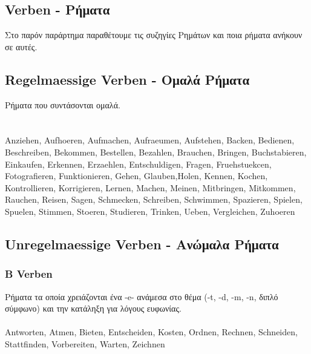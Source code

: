 
\begin{appendix}
 
 \section{Verben - Ρήματα}
 
 Στο παρόν παράρτημα παραθέτουμε τις συζηγίες Ρημάτων και ποια ρήματα ανήκουν σε αυτές.
 
 \subsection{Regelmaessige Verben - Ομαλά Ρήματα}
 Ρήματα που συντάσονται ομαλά. \\ 
  \\ 
  \\
 
 \gls{Anziehen}, \gls{Aufhoeren}, \gls{Aufmachen}, \gls{Aufraeumen}, \gls{Aufstehen}, \gls{Backen}, \gls{Bedienen}, \gls{Beschreiben}, \gls{Bekommen}, \gls{Bestellen}, \gls{Bezahlen}, \gls{Brauchen}, \gls{Bringen}, \gls{Buchstabieren}, \gls{Einkaufen}, \gls{Erkennen}, \gls{Erzaehlen}, \gls{Entschuldigen}, \gls{Fragen}, \gls{Fruehstuekcen}, \gls{Fotografieren}, \gls{Funktionieren}, \gls{Gehen}, \gls{Glauben},\gls{Holen}, \gls{Kennen}, \gls{Kochen}, \gls{Kontrollieren}, \gls{Korrigieren}, \gls{Lernen}, \gls{Machen}, \gls{Meinen}, \gls{Mitbringen}, \gls{Mitkommen}, \gls{Rauchen}, \gls{Reisen}, \gls{Sagen}, \gls{Schmecken}, \gls{Schreiben}, \gls{Schwimmen}, \gls{Spazieren}, \gls{Spielen}, \gls{Spuelen}, \gls{Stimmen}, \gls{Stoeren}, \gls{Studieren}, \gls{Trinken}, \gls{Ueben}, \gls{Vergleichen}, \gls{Zuhoeren}
 
 \subsection{Unregelmaessige Verben - Ανώμαλα Ρήματα}
 
 \subsubsection{B Verben}
 Ρήματα τα οποία χρειάζονται ένα -e- ανάμεσα στο θέμα (-t, -d, -m, -n, διπλό σύμφωνο) και την κατάληξη για λόγους ευφωνίας. \\ \newline
  \\ \newline
 \gls{Antworten}, \gls{Atmen}, \gls{Bieten}, \gls{Entscheiden}, \gls{Kosten}, \gls{Ordnen}, \gls{Rechnen}, \gls{Schneiden}, \gls{Stattfinden}, \gls{Vorbereiten}, \gls{Warten}, \gls{Zeichnen}
 

\end{appendix}
